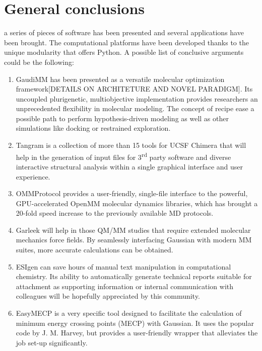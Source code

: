 \chapter{General conclusions}
\label{chap:07}

 a series of pieces of software has been presented and several applications have been brought. The computational platforms have been developed thanks to the unique modularity that offers Python. A possible list of conclusive arguments could be the following:



\begin{enumerate}
	\item GaudiMM has been presented as a versatile molecular optimization framework[DETAILS ON ARCHITETURE AND NOVEL PARADIGM]. Its uncoupled plurigenetic, multiobjective implementation provides researchers an unprecedented flexibility in molecular modeling.  The concept of recipe ease a possible path to perform hypothesis-driven modeling as well as other simulations like docking or restrained exploration.

	\item Tangram is a collection of more than 15 tools for UCSF Chimera that will help in the generation of input files for 3\textsuperscript{rd} party software and diverse interactive structural analysis within a single graphical interface and user experience.

	\item OMMProtocol provides a user-friendly, single-file interface to the powerful, GPU-accelerated OpenMM molecular dynamics libraries, which has brought a 20-fold speed increase to the previously available MD protocols.

	\item Garleek will help in those QM/MM studies that require extended molecular mechanics force fields. By seamlessly interfacing Gaussian with modern MM suites, more accurate calculations can be obtained.

	\item ESIgen can save hours of manual text manipulation in computational chemistry. Its ability to automatically generate technical reports suitable for attachment as supporting information or internal communication with colleagues will be hopefully appreciated by this community.

	\item EasyMECP is a very specific tool designed to facilitate the calculation of minimum energy crossing points (MECP) with Gaussian. It uses the popular code by J. M. Harvey, but provides a user-friendly wrapper that alleviates the job set-up significantly.
\end{enumerate}

